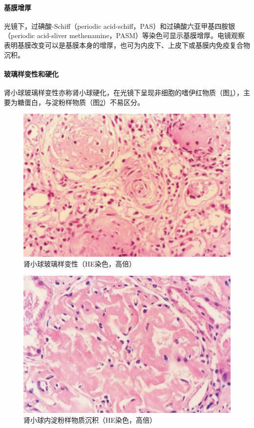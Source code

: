 \paragraph{基膜增厚}
光镜下，过碘酸-Schiff（periodic
acid-schiff，PAS）和过碘酸六亚甲基四胺银（periodic acid-sliver
methenamine，PASM）等染色可显示基膜增厚。电镜观察表明基膜改变可以是基膜本身的增厚，也可为内皮下、上皮下或基膜内免疫复合物沉积。

\paragraph{玻璃样变性和硬化}
肾小球玻璃样变性亦称肾小球硬化，在光镜下呈现非细胞的嗜伊红物质（图\ref{fig10-8}），主要为糖蛋白，与淀粉样物质（图\ref{fig10-9}）不易区分。

\begin{figure}[!htbp]
 \centering
 \includegraphics{./images/Image00154.jpg}
 \captionsetup{justification=centering}
 \caption{肾小球玻璃样变性（HE染色，高倍）}
 \label{fig10-8}
  \end{figure} 

\begin{figure}[!htbp]
 \centering
 \includegraphics{./images/Image00155.jpg}
 \captionsetup{justification=centering}
 \caption{肾小球内淀粉样物质沉积（HE染色，高倍）}
 \label{fig10-9}
  \end{figure} 

